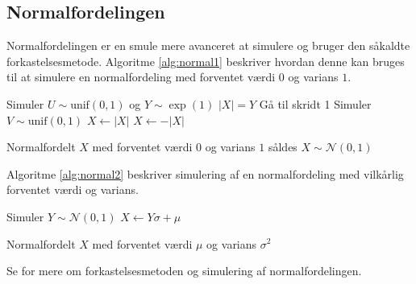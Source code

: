 \subsection{Normalfordelingen}
Normalfordelingen er en smule mere avanceret at simulere og bruger den såkaldte forkastelsesmetode. Algoritme \ref{alg:normal1} beskriver hvordan denne kan bruges til at simulere en normalfordeling med forventet værdi $0$ og varians $1$. 
\begin{algorithm}[H]
\begin{algorithmic}[1]
\STATE Simuler $U \sim \text{unif}(0,1)$ og $Y \sim \exp(1)$  
\STATE $|X| = Y$ 
\ELSE
\STATE Gå til skridt 1
\ENDIF
\STATE Simuler $V \sim \text{unif}(0,1)$ 
\STATE $X \gets |X|$
\ELSE
\STATE $X \gets -|X|$
\ENDIF
\end{algorithmic}
\caption{Normalfordelt $X$ med forventet værdi $0$ og varians $1$ såldes $X \sim \mathcal{N}(0,1)$} \label{alg:normal1}
\end{algorithm}
Algoritme \ref{alg:normal2} beskriver simulering af en normalfordeling med vilkårlig forventet værdi og varians.
\begin{algorithm}[H]
\begin{algorithmic}
\STATE Simuler $Y \sim \mathcal{N}(0,1)$ 
\STATE $X \gets Y\sigma + \mu$
\end{algorithmic}
\caption{Normalfordelt $X$ med forventet værdi $\mu$ og varians $\sigma^2$} \label{alg:normal2}
\end{algorithm}
Se \cite[288-290]{olofsson2012} for mere om forkastelsesmetoden og simulering af normalfordelingen. 
